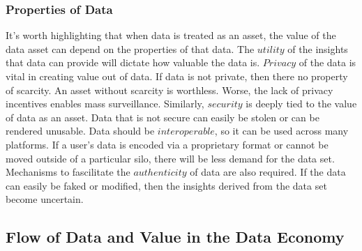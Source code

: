 

\subsubsection{Properties of Data}

It's worth highlighting that when data is treated as an asset, the value of the data asset can depend on the properties of that data. The $\mathit{utility}$ of 
the insights that data can provide will dictate how valuable the data is. $\mathit{Privacy}$ of the data is vital in creating value out of data. If data is not private, 
then there no property of scarcity. An asset without scarcity is worthless. Worse, the lack of privacy incentives enables mass surveillance.
Similarly, $\mathit{security}$ is deeply tied to the value of data as an asset. Data that is not secure can easily be stolen or can be rendered unusable. 
Data should be $\mathit{interoperable}$, so it can be used across many platforms. If a user's data is encoded via a proprietary format or cannot be moved outside 
of a particular silo, there will be less demand for the data set. Mechanisms to fascilitate the $\mathit{authenticity}$ of data are also required. If the data can 
easily be faked or modified, then the insights derived from the data set become uncertain.






\subsection{Flow of Data and Value in the Data Economy}
\label{section:Actors}

